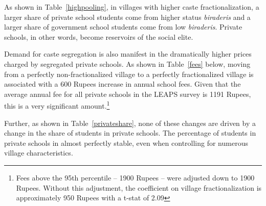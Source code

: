 \documentclass[Eubank_pk_ethnic_sorting.tex]{subfiles}
\begin{document}
As shown in Table~\ref{highpooling}, in villages with higher caste fractionalization, a larger share of private school students come from higher status \emph{biraderis} and a larger share of government school students come from low \emph{biraderis}. Private schools, in other words, become reservoirs of the social elite. 




Demand for caste segregation is also manifest in the dramatically higher prices charged by segregated private schools. As shown in Table~\ref{fees} below, moving from a perfectly non-fractionalized village to a perfectly fractionalized village is associated with a 600 Rupees increase in annual school fees. Given that the average annual fee for all private schools in the LEAPS survey is 1191 Rupees, this is a very significant amount.\footnote{Fees above the 95th percentile -- 1900 Rupees -- were adjusted down to 1900 Rupees. Without this adjustment, the coefficient on village fractionalization is approximately 950 Rupees with a t-stat of 2.09} 



Further, as shown in Table~\ref{privateshare}, none of these changes are driven by a change in the share of students in private schools. The percentage of students in private schools in almost perfectly stable, even when controlling for numerous village characteristics. 


\end{document}

